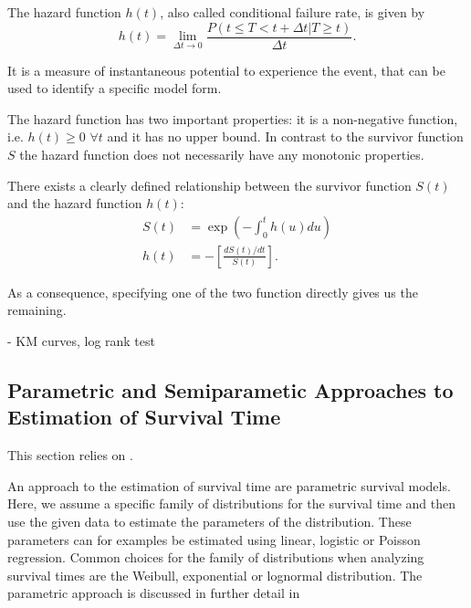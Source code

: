 \documentclass[12pt, a4paper]{article}
\theoremstyle{definition}
\theoremstyle{plain}
\numberwithin{equation}{section}
\numberwithin{figure}{section}
\numberwithin{table}{section}
\begin{document}
	
	The hazard function $h(t)$, also called conditional failure rate, is given by
	\begin{equation*}
		h(t) = \lim_{\Delta t \to 0}\frac{P(t \leq T < t + \Delta t \vert T \geq t)}{\Delta t}.
	\end{equation*} 
	
	It is a measure of instantaneous potential to experience the event, that can be used to identify a specific model form.
	
	The hazard function has two important properties: it is a non-negative function, i.e. $h(t) \geq 0$ $ \forall t$ and it has no upper bound.
	In contrast to the survivor function $S$ the hazard function does not necessarily have any monotonic properties.

	There exists a clearly defined relationship between the survivor function $S(t)$ and the hazard function $h(t)$:
	\begin{equation*}
	\begin{split}
		S(t) &= \exp \left( - \int_{0}^{t}h(u)du\right) \\
		h(t) & = - \left[ \frac{dS(t)/dt}{S(t)}\right].
	\end{split}
	\end{equation*}

	As a consequence, specifying one of the two function directly gives us the remaining.
	
	- KM curves, log rank test
	
	
	\subsection{Parametric and Semiparametic Approaches to Estimation of Survival Time} \label{cox}

	This section relies on \citet*{sabook}.
	
	An approach to the estimation of survival time are parametric survival models.
	Here, we assume a specific family of distributions for the survival time and then use the given data to estimate the parameters of the distribution.
	These parameters can for examples be estimated using linear, logistic or Poisson regression.
	Common choices for the family of distributions when analyzing survival times are the Weibull, exponential or lognormal distribution.
	The parametric approach is discussed in further detail in \citet*{sabook}
	
\end{document}
